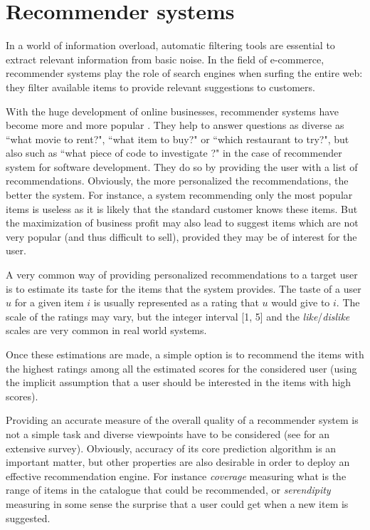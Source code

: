 \chapter{Recommender systems}

In a world of information overload, automatic filtering tools are essential to
extract relevant information from basic noise. In the field of e-commerce,
recommender systems play the role of search engines when surfing the entire
web: they filter available items to provide relevant suggestions to customers.

With the huge development of online businesses, recommender systems have become
more and more popular \cite{RecoSystemHandbook,AdoTuzIEEE2005}. They help to
answer questions as diverse as ``what movie to rent?", ``what item to buy?" or
``which restaurant to try?", but also such as ``what piece of code to
investigate ?" in the case of recommender system for software development.
They do so by providing the user with a list of recommendations.  Obviously,
the more personalized the recommendations, the better the system.  For
instance, a system recommending only the most popular items is useless as it is
likely that the standard customer knows these items. But the maximization of
business profit may also lead to suggest items which are not very popular (and
thus difficult to sell), provided they may be of interest for the user.

A very common way of providing personalized recommendations to a target user is
to estimate its taste for the items that the system provides. The taste of a user
$u$ for a given item $i$ is usually represented as a rating that $u$ would give
to $i$.  The scale of the ratings may vary, but the integer interval [1, 5] and
the \textit{like}/\textit{dislike} scales are very common in real world
systems.

Once these estimations are made, a simple option is to recommend the items with
the highest ratings among all the estimated scores for the considered user
(using the implicit assumption that a user should be interested in the items
with high scores).

Providing an accurate measure of the overall quality of a recommender system is
not a simple task and diverse viewpoints have to be considered (see
\cite{RecoSystemHandbook} for an extensive survey).  Obviously, accuracy of
its core prediction algorithm is an important matter, but other properties are
also desirable in order  to deploy an effective recommendation engine. For
instance {\it coverage} measuring what is the range of items in the catalogue
that could be recommended, or {\it serendipity} measuring in some sense the
surprise that a user could get when a new item is suggested.

